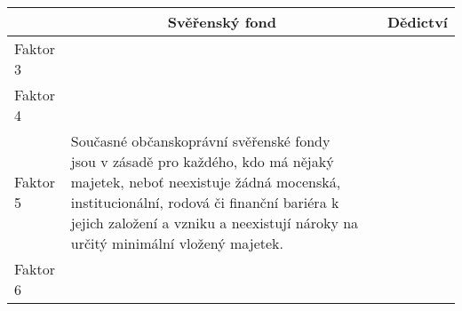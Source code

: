 \documentclass{article}
\begin{document}
\newpage

\noindent\begin{tabularx}{\textwidth}{X|X|X|X|X|}
\cline{2-5}
                               & \multicolumn{2}{c|}{Svěřenský fond} & \multicolumn{2}{c|}{Dědictví} \\ \hline
\multicolumn{1}{|l|}{Faktor 3} &                   &                 &                &              \\ \hline
\multicolumn{1}{|l|}{Faktor 4} &                   &                 &                &              \\ \hline
\multicolumn{1}{|l|}{Faktor 5} &         Současné občanskoprávní svěřenské fondy jsou v zásadě pro každého, kdo má nějaký majetek, neboť neexistuje žádná mocenská, institucionální, rodová či finanční bariéra k jejich založení a vzniku a neexistují nároky na určitý minimální vložený majetek.          &                 &                &              \\ \hline
\multicolumn{1}{|l|}{Faktor 6} &                   &                 &                &              \\ \hline
\end{tabularx}

\newpage
\end{document}
